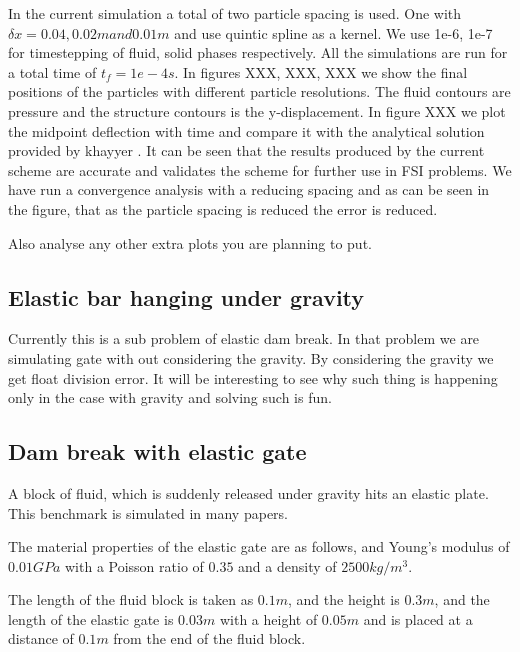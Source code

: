 \documentclass[preprint,12pt]{elsarticle}
\begin{document}
In the current simulation a total of two particle spacing is used. One with
$\delta x = 0.04 , 0.02m and 0.01 m$ and use quintic spline as a kernel. We
use 1e-6, 1e-7 for timestepping of fluid, solid phases respectively. All the
simulations are run for a total time of $t_f = 1e-4s$. In figures XXX, XXX,
XXX we show the final positions of the particles with different particle
resolutions. The fluid contours are pressure and the structure contours is the
y-displacement. In figure XXX we plot the midpoint deflection with time and
compare it with the analytical solution provided by khayyer . It can be seen
that the results produced by the current scheme are accurate and validates the
scheme for further use in FSI problems. We have run a convergence analysis
with a reducing spacing and as can be seen in the figure, that as the particle
spacing is reduced the error is reduced.

Also analyse any other extra plots you are planning to put.




\subsection{Elastic bar hanging under gravity}
\label{sec:elastic-bar-hanging}


Currently this is a sub problem of elastic dam break. In that problem we are
simulating gate with out considering the gravity. By considering the gravity
we get float division error. It will be interesting to see why such thing is
happening only in the case with gravity and solving such is fun.


\subsection{Dam break with elastic gate}
\label{sec:dam-break-elastic-gate}

A block of fluid, which is suddenly released under gravity hits an elastic
plate. This benchmark is simulated in many papers.

The material properties of the elastic gate are as follows, and Young's
modulus of $0.01 GPa$ with a Poisson ratio of $0.35$ and a density of
$2500 kg/m^3$.

The length of the fluid block is taken as $0.1m$, and the height is $0.3m$,
and the length of the elastic gate is $0.03m$ with a height of $0.05m$ and is
placed at a distance of $0.1m$ from the end of the fluid block.
\end{document}
